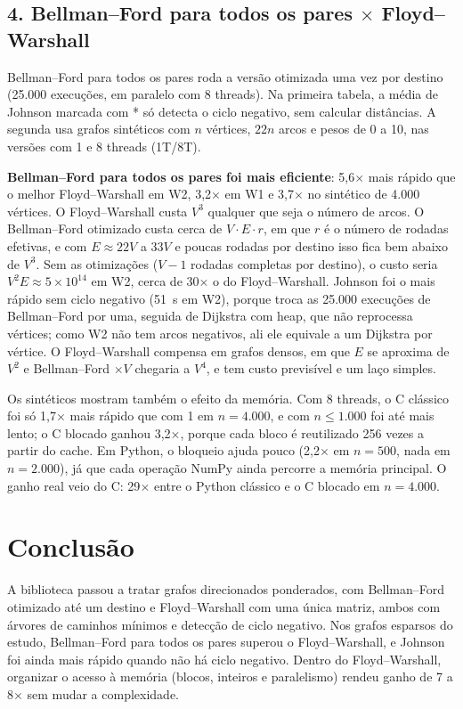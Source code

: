 \documentclass[a4paper,11pt]{article}
\begin{document}
\subsection*{4. Bellman--Ford para todos os pares \(\times\) Floyd--Warshall}

Bellman--Ford para todos os pares roda a versão otimizada uma vez por destino (25.000 execuções, em paralelo com 8 threads). Na primeira tabela, a média de Johnson marcada com * só detecta o ciclo negativo, sem calcular distâncias. A segunda usa grafos sintéticos com \(n\) vértices, \(22n\) arcos e pesos de 0 a 10, nas versões com 1 e 8 threads (1T/8T).

\begin{center}
\TabelaTodosPares
\par\medskip
\footnotesize\setlength{\tabcolsep}{4pt}
\TabelaSinteticos
\end{center}

\textbf{Bellman--Ford para todos os pares foi mais eficiente}: 5,6\(\times\) mais rápido que o melhor Floyd--Warshall em W2, 3,2\(\times\) em W1 e 3,7\(\times\) no sintético de 4.000 vértices. O Floyd--Warshall custa \(V^3\) qualquer que seja o número de arcos. O Bellman--Ford otimizado custa cerca de \(V\cdot E\cdot r\), em que \(r\) é o número de rodadas efetivas, e com \(E\approx22V\) a \(33V\) e poucas rodadas por destino isso fica bem abaixo de \(V^3\). Sem as otimizações (\(V-1\) rodadas completas por destino), o custo seria \(V^2E\approx5\times10^{14}\) em W2, cerca de 30\(\times\) o do Floyd--Warshall. Johnson foi o mais rápido sem ciclo negativo (51~s em W2), porque troca as 25.000 execuções de Bellman--Ford por uma, seguida de Dijkstra com heap, que não reprocessa vértices; como W2 não tem arcos negativos, ali ele equivale a um Dijkstra por vértice. O Floyd--Warshall compensa em grafos densos, em que \(E\) se aproxima de \(V^2\) e Bellman--Ford \(\times V\) chegaria a \(V^4\), e tem custo previsível e um laço simples.

Os sintéticos mostram também o efeito da memória. Com 8 threads, o C clássico foi só 1,7\(\times\) mais rápido que com 1 em \(n=4.000\), e com \(n\le1.000\) foi até mais lento; o C blocado ganhou 3,2\(\times\), porque cada bloco é reutilizado 256 vezes a partir do cache. Em Python, o bloqueio ajuda pouco (2,2\(\times\) em \(n=500\), nada em \(n=2.000\)), já que cada operação NumPy ainda percorre a memória principal. O ganho real veio do C: 29\(\times\) entre o Python clássico e o C blocado em \(n=4.000\).

\section{Conclusão}

A biblioteca passou a tratar grafos direcionados ponderados, com Bellman--Ford otimizado até um destino e Floyd--Warshall com uma única matriz, ambos com árvores de caminhos mínimos e detecção de ciclo negativo. Nos grafos esparsos do estudo, Bellman--Ford para todos os pares superou o Floyd--Warshall, e Johnson foi ainda mais rápido quando não há ciclo negativo. Dentro do Floyd--Warshall, organizar o acesso à memória (blocos, inteiros e paralelismo) rendeu ganho de 7 a 8\(\times\) sem mudar a complexidade.
\end{document}
